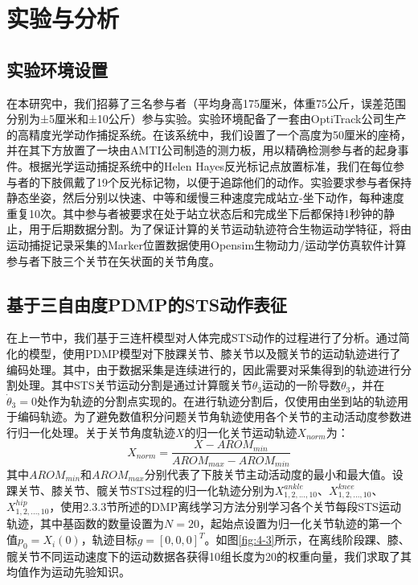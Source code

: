 \section{实验与分析}
\subsection{实验环境设置} 
在本研究中，我们招募了三名参与者（平均身高175厘米，体重75公斤，误差范围分别为±5厘米和±10公斤）参与实验。实验环境配备了一套由OptiTrack公司生产的高精度光学动作捕捉系统。在该系统中，我们设置了一个高度为50厘米的座椅，并在其下方放置了一块由AMTI公司制造的测力板，用以精确检测参与者的起身事件。根据光学运动捕捉系统中的Helen Hayes反光标记点放置标准，我们在每位参与者的下肢佩戴了19个反光标记物，以便于追踪他们的动作。实验要求参与者保持静态坐姿，然后分别以快速、中等和缓慢三种速度完成站立-坐下动作，每种速度重复10次。其中参与者被要求在处于站立状态后和完成坐下后都保持1秒钟的静止，用于后期数据分割。为了保证计算的关节运动轨迹符合生物运动学特征，将由运动捕捉记录采集的Marker位置数据使用Opensim生物动力/运动学仿真软件计算参与者下肢三个关节在矢状面的关节角度。

\subsection{基于三自由度PDMP的STS动作表征} 
在上一节中，我们基于三连杆模型对人体完成STS动作的过程进行了分析。通过简化的模型，使用PDMP模型对下肢踝关节、膝关节以及髋关节的运动轨迹进行了编码处理。其中，由于数据采集是连续进行的，因此需要对采集得到的轨迹进行分割处理。其中STS关节运动分割是通过计算髋关节$\theta_3$运动的一阶导数$\dot\theta_3$，并在$\dot\theta_3=0$处作为轨迹的分割点实现的。在进行轨迹分割后，仅使用由坐到站的轨迹用于编码轨迹。为了避免数值积分问题关节角轨迹使用各个关节的主动活动度参数进行归一化处理。关于关节角度轨迹$X$的归一化关节运动轨迹$X_{norm}$为：
\begin{equation}
    X_{norm} = \frac{X-AROM_{min}}{AROM_{max}-AROM_{min}}
\end{equation}
其中$AROM_{min}$和$AROM_{max}$分别代表了下肢关节主动活动度的最小和最大值。设踝关节、膝关节、髋关节STS过程的归一化轨迹分别为$X_{1,2,...,10}^{ankle}$、$X_{1,2,...,10}^{knee}$、$X_{1,2,...,10}^{hip}$，使用2.3.3节所述的DMP离线学习方法分别学习各个关节每段STS运动轨迹，其中基函数的数量设置为$N=20$，起始点设置为归一化关节轨迹的第一个值$p_0=X_i(0)$，轨迹目标$g=[0,0,0]^T$。如图\ref{fig:4-3}所示，在离线阶段踝、膝、髋关节不同运动速度下的运动数据各获得10组长度为20的权重向量，我们求取了其均值作为运动先验知识。

